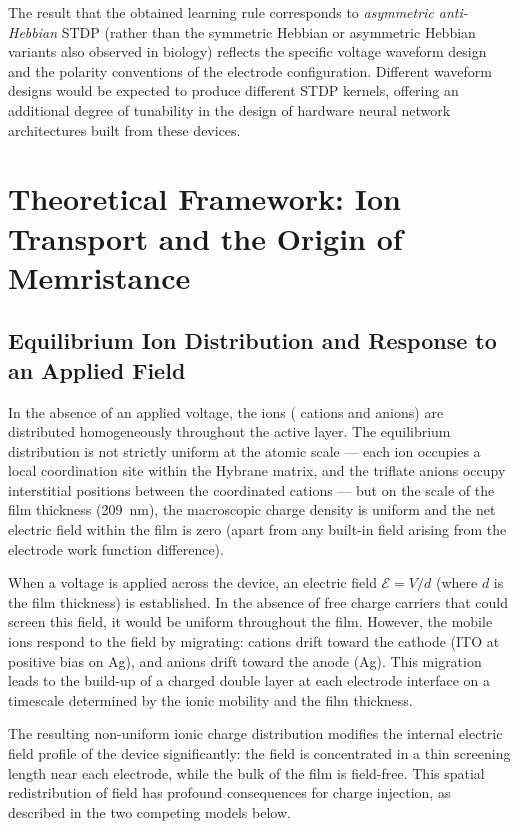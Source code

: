 \documentclass[12pt, a4paper, twoside]{report}
\begin{document}
The result that the obtained learning rule corresponds to \textit{asymmetric anti-Hebbian} STDP (rather than the symmetric Hebbian or asymmetric Hebbian variants also observed in biology) reflects the specific voltage waveform design and the polarity conventions of the electrode configuration. Different waveform designs would be expected to produce different STDP kernels, offering an additional degree of tunability in the design of hardware neural network architectures built from these devices.


\section{Theoretical Framework: Ion Transport and the Origin of Memristance}\label{sec:mechanism}

\subsection{Equilibrium Ion Distribution and Response to an Applied Field}\label{subsec:equilibrium}

In the absence of an applied voltage, the ions ( cations and  anions) are distributed homogeneously throughout the active layer. The equilibrium distribution is not strictly uniform at the atomic scale — each  ion occupies a local coordination site within the Hybrane matrix, and the triflate anions occupy interstitial positions between the coordinated cations — but on the scale of the film thickness (\SI{209}{\nano\metre}), the macroscopic charge density is uniform and the net electric field within the film is zero (apart from any built-in field arising from the electrode work function difference).

When a voltage is applied across the device, an electric field $\mathcal{E} = V/d$ (where $d$ is the film thickness) is established. In the absence of free charge carriers that could screen this field, it would be uniform throughout the film. However, the mobile ions respond to the field by migrating: cations drift toward the cathode (ITO at positive bias on Ag), and anions drift toward the anode (Ag). This migration leads to the build-up of a charged double layer at each electrode interface on a timescale determined by the ionic mobility and the film thickness.

The resulting non-uniform ionic charge distribution modifies the internal electric field profile of the device significantly: the field is concentrated in a thin screening length near each electrode, while the bulk of the film is field-free. This spatial redistribution of field has profound consequences for charge injection, as described in the two competing models below.
\end{document}
